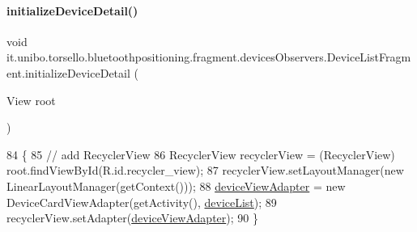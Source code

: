 \paragraph{\texorpdfstring{initialize\+Device\+Detail()}{initializeDeviceDetail()}}
{\footnotesize\ttfamily void it.\+unibo.\+torsello.\+bluetoothpositioning.\+fragment.\+devices\+Observers.\+Device\+List\+Fragment.\+initialize\+Device\+Detail (\begin{DoxyParamCaption}\item[{View}]{root }\end{DoxyParamCaption})\hspace{0.3cm}{\ttfamily [private]}}


\begin{DoxyCode}
84                                                    \{
85         \textcolor{comment}{// add RecyclerView}
86         RecyclerView recyclerView = (RecyclerView) root.findViewById(R.id.recycler\_view);
87         recyclerView.setLayoutManager(\textcolor{keyword}{new} LinearLayoutManager(getContext()));
88         \hyperlink{classit_1_1unibo_1_1torsello_1_1bluetoothpositioning_1_1fragment_1_1devicesObservers_1_1DeviceListFragment_a5a6d0882c9d5551b13936776fb712b0a_a5a6d0882c9d5551b13936776fb712b0a}{deviceViewAdapter} = \textcolor{keyword}{new} DeviceCardViewAdapter(getActivity(), 
      \hyperlink{classit_1_1unibo_1_1torsello_1_1bluetoothpositioning_1_1fragment_1_1devicesObservers_1_1DeviceListFragment_ad728f2e256af2d4acf05d3cf900f3ad4_ad728f2e256af2d4acf05d3cf900f3ad4}{deviceList});
89         recyclerView.setAdapter(\hyperlink{classit_1_1unibo_1_1torsello_1_1bluetoothpositioning_1_1fragment_1_1devicesObservers_1_1DeviceListFragment_a5a6d0882c9d5551b13936776fb712b0a_a5a6d0882c9d5551b13936776fb712b0a}{deviceViewAdapter});
90     \}
\end{DoxyCode}
\hypertarget{classit_1_1unibo_1_1torsello_1_1bluetoothpositioning_1_1fragment_1_1devicesObservers_1_1DeviceListFragment_aae7377d92372118bec0bd8a6aa2c61c0_aae7377d92372118bec0bd8a6aa2c61c0}{}\label{classit_1_1unibo_1_1torsello_1_1bluetoothpositioning_1_1fragment_1_1devicesObservers_1_1DeviceListFragment_aae7377d92372118bec0bd8a6aa2c61c0_aae7377d92372118bec0bd8a6aa2c61c0} 
